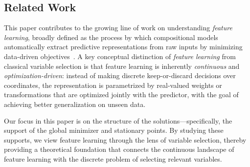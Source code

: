 \documentclass[sn-mathphys-num]{sn-jnl}%
\numberwithin{equation}{section}
\theoremstyle{thmstyleone}%
\theoremstyle{thmstyletwo}%
\theoremstyle{thmstylethree}%
\begin{document}

%
%

\subsection{Related Work} 
This paper contributes to the growing line of work on understanding \emph{feature learning}, broadly defined as the process by which compositional models automatically extract predictive representations from raw inputs by minimizing data-driven objectives~\cite{BengioCoVi13}. A key conceptual distinction of \emph{feature learning} from classical variable selection is that feature learning is inherently \emph{continuous} and \emph{optimization-driven}: instead of making discrete keep-or-discard decisions over coordinates, the representation is parametrized by real-valued weights or transformations that are optimized jointly with the predictor, with the goal of achieving better generalization on unseen data.

Our focus in this paper is on the structure of the solutions---specifically, the support of the global minimizer and stationary points. By studying these supports, we view feature learning through the lens of variable selection, thereby providing a theoretical foundation that connects the continuous landscape of feature learning with the discrete problem of selecting relevant variables.
\end{document}
